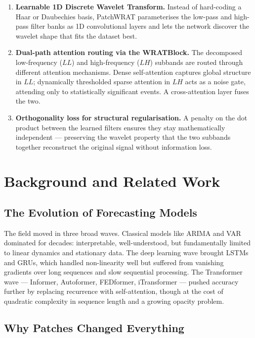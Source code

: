\documentclass[11pt, letterpaper]{article}
\begin{document}
\begin{enumerate}
  \item \textbf{Learnable 1D Discrete Wavelet Transform.} Instead of hard-coding a Haar or
  Daubechies basis, PatchWRAT parameterises the low-pass and high-pass filter banks as 1D
  convolutional layers and lets the network discover the wavelet shape that fits the dataset best.

  \item \textbf{Dual-path attention routing via the WRATBlock.} The decomposed low-frequency
  ($LL$) and high-frequency ($LH$) subbands are routed through different attention mechanisms.
  Dense self-attention captures global structure in $LL$; dynamically thresholded sparse
  attention in $LH$ acts as a noise gate, attending only to statistically significant events.
  A cross-attention layer fuses the two.

  \item \textbf{Orthogonality loss for structural regularisation.} A penalty on the dot product
  between the learned filters ensures they stay mathematically independent — preserving the
  wavelet property that the two subbands together reconstruct the original signal without
  information loss.
\end{enumerate}

\section{Background and Related Work}

\subsection{The Evolution of Forecasting Models}

The field moved in three broad waves. Classical models like ARIMA and VAR dominated for
decades: interpretable, well-understood, but fundamentally limited to linear dynamics and
stationary data. The deep learning wave brought LSTMs and GRUs, which handled non-linearity
well but suffered from vanishing gradients over long sequences and slow sequential processing.
The Transformer wave — Informer, Autoformer, FEDformer, iTransformer — pushed accuracy
further by replacing recurrence with self-attention, though at the cost of quadratic complexity
in sequence length and a growing opacity problem.

\subsection{Why Patches Changed Everything}
\end{document}
